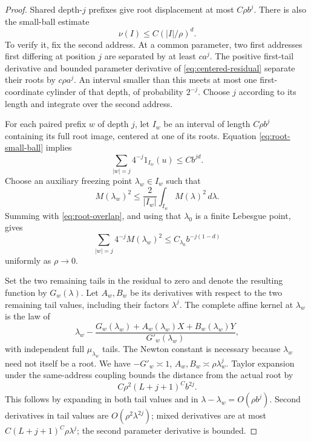 \documentclass[11pt,a4paper]{amsart}
\numberwithin{equation}{section}
\theoremstyle{definition}
\begin{document}
\begin{proof}
Shared depth-\(j\) prefixes give root displacement at most
\(C\rho b^j\). There is also the small-ball estimate
\begin{equation}
\nu(I)\leq C(|I|/\rho)^d.
\label{eq:root-small-ball}
\end{equation}
To verify it, fix the second address. At a common parameter,
two first addresses first differing at position \(j\) are
separated by at least \(c a^j\). The positive first-tail
derivative and bounded parameter derivative of
\eqref{eq:centered-residual} separate their roots by
\(c\rho a^j\). An interval smaller than this meets at most one
first-coordinate cylinder of that depth, of probability \(2^{-j}\).
Choose \(j\) according to its length and integrate over the
second address.

For each paired prefix \(w\) of depth \(j\), let \(I_w\) be an
interval of length \(C\rho b^j\) containing its full root image,
centered at one of its roots. Equation \eqref{eq:root-small-ball}
implies
\begin{equation}
\sum_{|w|=j}4^{-j}1_{I_w}(u)\leq Cb^{jd}.
\label{eq:root-overlap}
\end{equation}
Choose an auxiliary freezing point \(\lambda_w\in I_w\) such that
\[
M(\lambda_w)^2\leq\frac2{|I_w|}\int_{I_w}M(\lambda)^2\,d\lambda.
\]
Summing with \eqref{eq:root-overlap}, and using that \(\lambda_0\)
is a finite Lebesgue point, gives
\begin{equation}
\sum_{|w|=j}4^{-j}M(\lambda_w)^2
\leq C_{\lambda_0}b^{-j(1-d)}
\label{eq:average-freezing}
\end{equation}
uniformly as \(\rho\to0\).

Set the two remaining tails in the residual to zero and denote
the resulting function by \(G_w(\lambda)\).
Let \(A_w,B_w\) be its derivatives with respect to the two
remaining tail values, including their factors \(\lambda^j\).
The complete affine kernel at \(\lambda_w\) is the law of
\begin{equation}
\lambda_w-\frac{G_w(\lambda_w)+A_w(\lambda_w)X+
 B_w(\lambda_w)Y}{G'_w(\lambda_w)},
\label{eq:newton-kernel}
\end{equation}
with independent full \(\mu_{\lambda_w}\) tails.
The Newton constant is necessary because \(\lambda_w\) need
not itself be a root. We have
\(-G'_w\asymp1\), \(A_w,B_w\asymp\rho\lambda_w^j\).
Taylor expansion under the same-address coupling bounds the
distance from the actual root by
\begin{equation}
C\rho^2(L+j+1)^C b^{2j}.
\label{eq:newton-error}
\end{equation}
This follows by expanding in both tail values and in
\(\lambda-\lambda_w=O(\rho b^j)\). Second derivatives in tail
values are \(O(\rho^2\lambda^{2j})\); mixed derivatives are at
most \(C(L+j+1)^C\rho\lambda^j\); the second parameter
derivative is bounded.


\end{proof}
\end{document}
